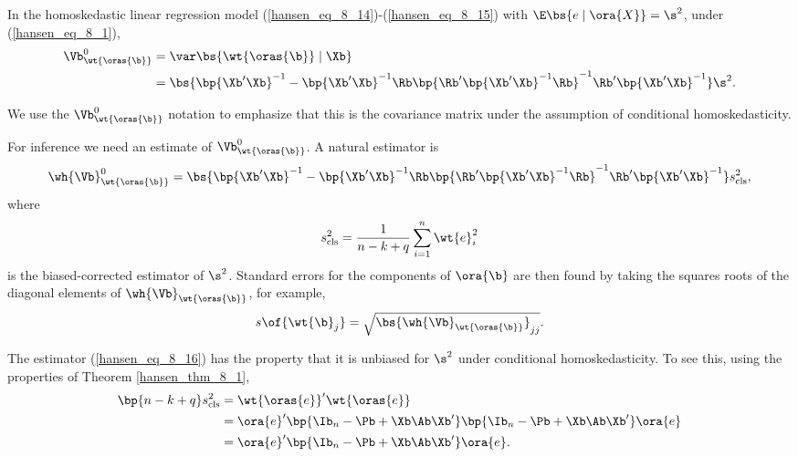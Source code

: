 \begin{theorem}
    \label{hansen_thm_8_3}
    In the homoskedastic linear regression model (\ref{hansen_eq_8_14})-(\ref{hansen_eq_8_15}) with $\E\bs{e \mid \ora{X}} = \s^2$, under (\ref{hansen_eq_8_1}),
    \begin{equation}
        \notag 
        \begin{aligned}
            \Vb_{\wt{\oras{\b}}}^0 & = \var\bs{\wt{\oras{\b}} \mid \Xb} \\
            & = \bs{\bp{\Xb^{\prime} \Xb}^{-1} - \bp{\Xb^{\prime} \Xb}^{-1} \Rb \bp{\Rb^{\prime} \bp{\Xb^{\prime} \Xb}^{-1} \Rb}^{-1} \Rb^{\prime} \bp{\Xb^{\prime} \Xb}^{-1}} \s^2 .
        \end{aligned}
    \end{equation}
\end{theorem}
We use the $\Vb_{\wt{\oras{\b}}}^0$ notation to emphasize that this is the covariance matrix under the assumption of conditional homoskedasticity.

For inference we need an estimate of $\Vb_{\wt{\oras{\b}}}^0$. A natural estimator is 
\begin{equation}
    \notag 
    \wh{\Vb}_{\wt{\oras{\b}}}^0 = \bs{\bp{\Xb^{\prime} \Xb}^{-1} - \bp{\Xb^{\prime} \Xb}^{-1} \Rb \bp{\Rb^{\prime} \bp{\Xb^{\prime} \Xb}^{-1} \Rb}^{-1} \Rb^{\prime} \bp{\Xb^{\prime} \Xb}^{-1}} s_{\text{cls}}^2,
\end{equation}
where 
\begin{equation}
    \label{hansen_eq_8_16}
    s_{\text{cls}}^2 = \frac{1}{n - k + q} \sum_{i=1}^{n} \wt{e}_i^2
\end{equation}
is the biased-corrected estimator of $\s^2$. Standard errors for the components of $\ora{\b}$ are then found by taking the squares roots of the diagonal elements of $\wh{\Vb}_{\wt{\oras{\b}}}$, for example, 
\begin{equation}
    \notag 
    s\of{\wt{\b}_j} = \sqrt{\bs{\wh{\Vb}_{\wt{\oras{\b}}}}_{jj}}.
\end{equation}

The estimator (\ref{hansen_eq_8_16}) has the property that it is unbiased for $\s^2$ under conditional homoskedasticity. To see this, using the properties of Theorem \ref{hansen_thm_8_1}, 
\begin{equation}
    \label{hansen_eq_8_17}
    \begin{aligned}
        \bp{n-k+q} s^{2}_{\text{cls}} & = \wt{\oras{e}}^{\prime}\wt{\oras{e}} \\
        & = \ora{e}^{\prime} \bp{\Ib_n - \Pb + \Xb \Ab \Xb^{\prime}} \bp{\Ib_n - \Pb + \Xb \Ab \Xb^{\prime}} \ora{e} \\
        & = \ora{e}^{\prime} \bp{\Ib_n - \Pb + \Xb \Ab \Xb^{\prime}} \ora{e} .
    \end{aligned}
\end{equation}

